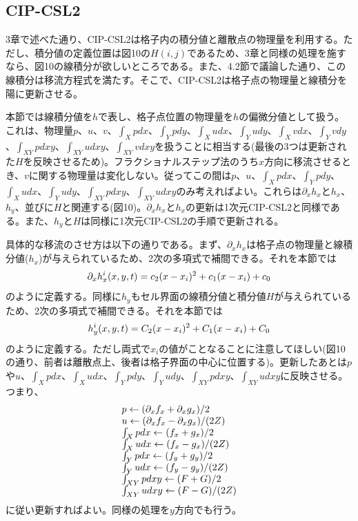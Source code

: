 \documentclass[dvipdfmx, 9pt, a4paper]{jsarticle}
\begin{document}
\subsection{CIP-CSL2}
3章で述べた通り、CIP-CSL2は格子内の積分値と離散点の物理量を利用する。ただし、積分値の定義位置は図10の$H(i, j)$であるため、3章と同様の処理を施すなら、図10の線積分が欲しいところである。また、4.2節で議論した通り、この線積分は移流方程式を満たす。そこで、CIP-CSL2は格子点の物理量と線積分を陽に更新させる。\par
本節では線積分値を$h$で表し、格子点位置の物理量を$h$の偏微分値として扱う。これは、物理量$p$、$u$、$v$、$\int_Xpdx$、$\int_Ypdy$、$\int_Xudx$、$\int_Yudy$、$\int_Xvdx$、$\int_Yvdy$、$\int_{XY}pdxy$、$\int_{XY}udxy$、$\int_{XY}vdxy$を扱うことに相当する(最後の3つは更新された$H$を反映させるため)。フラクショナルステップ法のうち$x$方向に移流させるとき、$v$に関する物理量は変化しない。従ってこの間は$p$、$u$、$\int_Xpdx$、$\int_Ypdy$、$\int_Xudx$、$\int_Yudy$、$\int_{XY}pdxy$、$\int_{XY}udxy$のみ考えればよい。これらは$\partial_xh_x$と$h_x$、$h_y$、並びに$H$と関連する(図10)。$\partial_xh_x$と$h_x$の更新は1次元CIP-CSL2と同様である。また、$h_y$と$H$は同様に1次元CIP-CSL2の手順で更新される。\par
具体的な移流のさせ方は以下の通りである。まず、$\partial_xh_x$は格子点の物理量と線積分値($h_x$)が与えられているため、2次の多項式で補間できる。それを本節では
\begin{equation}
\partial_xh^i_x(x, y, t)=c_2(x-x_i)^2+c_1(x-x_i)+c_0 \notag
\end{equation}
のように定義する。同様に$h_y$もセル界面の線積分値と積分値$H$が与えられているため、2次の多項式で補間できる。それを本節では
\begin{equation}
h^i_y(x, y, t)=C_2(x-x_i)^2+C_1(x-x_i)+C_0 \notag
\end{equation}
のように定義する。ただし両式で$x_i$の値がことなることに注意してほしい(図10の通り、前者は離散点上、後者は格子界面の中心に位置する)。更新したあとは$p$や$u$、$\int_Xpdx$、$\int_Xudx$、$\int_Ypdy$、$\int_Yudy$、$\int_{XY}pdxy$、$\int_{XY}udxy$に反映させる。つまり、
\begin{equation}
\begin{array}{l}
p \leftarrow (\partial_xf_x + \partial_xg_x)/2 \\
u \leftarrow (\partial_xf_x - \partial_xg_x)/(2Z) \\
\int_Xpdx \leftarrow (f_x + g_x)/2 \\
\int_Xudx \leftarrow (f_x - g_x)/(2Z) \\
\int_Ypdx \leftarrow (f_y + g_y)/2 \\
\int_Yudx \leftarrow (f_y - g_y)/(2Z) \\
\int_{XY}pdxy \leftarrow (F + G)/2 \\
\int_{XY}udxy \leftarrow (F - G)/(2Z) \\
\end{array} \notag
\end{equation}
に従い更新すればよい。同様の処理を$y$方向でも行う。
\end{document}
